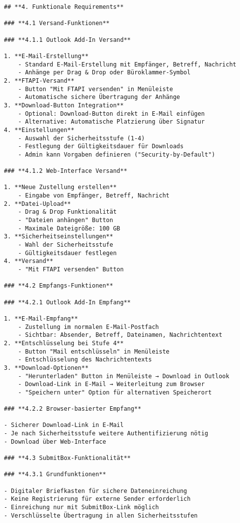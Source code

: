\begin{verbatim}
## **4. Funktionale Requirements**

### **4.1 Versand-Funktionen**

### **4.1.1 Outlook Add-In Versand**

1. **E-Mail-Erstellung**
    - Standard E-Mail-Erstellung mit Empfänger, Betreff, Nachricht
    - Anhänge per Drag & Drop oder Büroklammer-Symbol
2. **FTAPI-Versand**
    - Button "Mit FTAPI versenden" in Menüleiste
    - Automatische sichere Übertragung der Anhänge
3. **Download-Button Integration**
    - Optional: Download-Button direkt in E-Mail einfügen
    - Alternative: Automatische Platzierung über Signatur
4. **Einstellungen**
    - Auswahl der Sicherheitsstufe (1-4)
    - Festlegung der Gültigkeitsdauer für Downloads
    - Admin kann Vorgaben definieren ("Security-by-Default")

### **4.1.2 Web-Interface Versand**

1. **Neue Zustellung erstellen**
    - Eingabe von Empfänger, Betreff, Nachricht
2. **Datei-Upload**
    - Drag & Drop Funktionalität
    - "Dateien anhängen" Button
    - Maximale Dateigröße: 100 GB
3. **Sicherheitseinstellungen**
    - Wahl der Sicherheitsstufe
    - Gültigkeitsdauer festlegen
4. **Versand**
    - "Mit FTAPI versenden" Button

### **4.2 Empfangs-Funktionen**

### **4.2.1 Outlook Add-In Empfang**

1. **E-Mail-Empfang**
    - Zustellung im normalen E-Mail-Postfach
    - Sichtbar: Absender, Betreff, Dateinamen, Nachrichtentext
2. **Entschlüsselung bei Stufe 4**
    - Button "Mail entschlüsseln" in Menüleiste
    - Entschlüsselung des Nachrichtentexts
3. **Download-Optionen**
    - "Herunterladen" Button in Menüleiste → Download in Outlook
    - Download-Link in E-Mail → Weiterleitung zum Browser
    - "Speichern unter" Option für alternativen Speicherort

### **4.2.2 Browser-basierter Empfang**

- Sicherer Download-Link in E-Mail
- Je nach Sicherheitsstufe weitere Authentifizierung nötig
- Download über Web-Interface

### **4.3 SubmitBox-Funktionalität**

### **4.3.1 Grundfunktionen**

- Digitaler Briefkasten für sichere Dateneinreichung
- Keine Registrierung für externe Sender erforderlich
- Einreichung nur mit SubmitBox-Link möglich
- Verschlüsselte Übertragung in allen Sicherheitsstufen


\end{verbatim}
